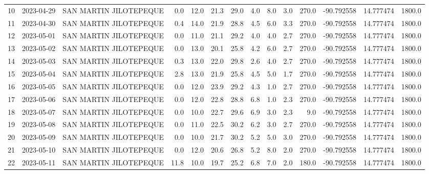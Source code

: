 \documentclass[12pt]{article}
\begin{document}
\begin{center}
\begin{tabular}{lllrrrrrrrrrrr}
10  & 2023-04-29 &  SAN MARTIN JILOTEPEQUE &     0.0 &  12.0 &   21.3 &  29.0 &        4.0 &  8.0 &         3.0 &       270.0 & -90.792558 &  14.777474 &   1800.0 \\
11  & 2023-04-30 &  SAN MARTIN JILOTEPEQUE &     0.4 &  14.0 &   21.9 &  28.8 &        4.5 &  6.0 &         3.3 &       270.0 & -90.792558 &  14.777474 &   1800.0 \\
12  & 2023-05-01 &  SAN MARTIN JILOTEPEQUE &     0.0 &  11.0 &   21.1 &  29.2 &        4.0 &  4.0 &         2.7 &       270.0 & -90.792558 &  14.777474 &   1800.0 \\
13  & 2023-05-02 &  SAN MARTIN JILOTEPEQUE &     0.0 &  13.0 &   20.1 &  25.8 &        4.2 &  6.0 &         2.7 &       270.0 & -90.792558 &  14.777474 &   1800.0 \\
14  & 2023-05-03 &  SAN MARTIN JILOTEPEQUE &     0.3 &  13.0 &   22.0 &  29.8 &        2.6 &  4.0 &         2.7 &       270.0 & -90.792558 &  14.777474 &   1800.0 \\
15  & 2023-05-04 &  SAN MARTIN JILOTEPEQUE &     2.8 &  13.0 &   21.9 &  25.8 &        4.5 &  5.0 &         1.7 &       270.0 & -90.792558 &  14.777474 &   1800.0 \\
16  & 2023-05-05 &  SAN MARTIN JILOTEPEQUE &     0.0 &  12.0 &   23.9 &  29.2 &        4.3 &  1.0 &         2.7 &       270.0 & -90.792558 &  14.777474 &   1800.0 \\
17  & 2023-05-06 &  SAN MARTIN JILOTEPEQUE &     0.0 &  12.0 &   22.8 &  28.8 &        6.8 &  1.0 &         2.3 &       270.0 & -90.792558 &  14.777474 &   1800.0 \\
18  & 2023-05-07 &  SAN MARTIN JILOTEPEQUE &     0.0 &  10.0 &   22.7 &  29.6 &        6.9 &  3.0 &         2.3 &         9.0 & -90.792558 &  14.777474 &   1800.0 \\
19  & 2023-05-08 &  SAN MARTIN JILOTEPEQUE &     0.0 &  11.0 &   22.5 &  30.2 &        6.2 &  3.0 &         2.7 &       270.0 & -90.792558 &  14.777474 &   1800.0 \\
20  & 2023-05-09 &  SAN MARTIN JILOTEPEQUE &     0.0 &  10.0 &   21.7 &  30.2 &        5.2 &  5.0 &         3.0 &       270.0 & -90.792558 &  14.777474 &   1800.0 \\
21  & 2023-05-10 &  SAN MARTIN JILOTEPEQUE &     0.0 &  12.0 &   20.6 &  26.8 &        5.2 &  8.0 &         2.0 &       270.0 & -90.792558 &  14.777474 &   1800.0 \\
22  & 2023-05-11 &  SAN MARTIN JILOTEPEQUE &    11.8 &  10.0 &   19.7 &  25.2 &        6.8 &  7.0 &         2.0 &       180.0 & -90.792558 &  14.777474 &   1800.0 \\

\end{tabular}
\end{center}
\end{document}
